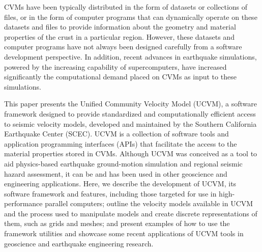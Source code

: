 CVMs have been typically distributed in the form of datasets or collections of files, or in the form of computer programs that can dynamically operate on these datasets and files to provide information about the geometry and material properties of the crust in a particular region. However, these datasets and computer programs have not always been designed carefully from a software development perspective. In addition, recent advances in earthquake simulations, powered by the increasing capability of supercomputers, have increased significantly the computational demand placed on CVMs as input to these simulations.

This paper presents the Unified Community Velocity Model (UCVM), a software framework designed to provide standardized and computationally efficient access to seismic velocity models, developed and maintained by the Southern California Earthquake Center (SCEC). UCVM is a collection of software tools and application programming interfaces (APIs) that facilitate the access to the material properties stored in CVMs. Although UCVM was conceived as a tool to aid physics-based earthquake ground-motion simulation and regional seismic hazard assessment, it can be and has been used in other geoscience and engineering applications. Here, we describe the development of UCVM, its software framework and features, including those targeted for use in high-performance parallel computers; outline the velocity models available in UCVM and the process used to manipulate models and create discrete representations of them, such as grids and meshes; and present examples of how to use the framework utilities and showcase some recent applications of UCVM tools in geoscience and earthquake engineering research.


